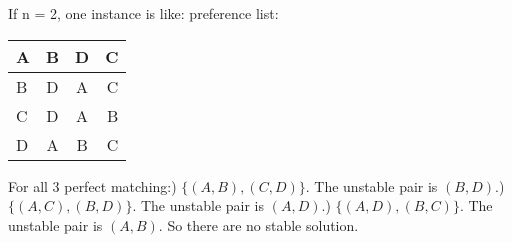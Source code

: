 \documentclass{article}       %
\begin{document}
\begin{enumerate}
\begin{enumerate}
                If n = 2, one instance is like: \newline
                preference list:
                \begin{tabular}{ | l | c | c | r | }
                	\hline
                	A & B & D & C\\ \hline
                	B & D & A & C \\ \hline
                	C & D & A & B \\ \hline
                	D & A & B & C \\ \hline
                \end{tabular} \newline
            For all 3 perfect matching:) $\{(A, B), (C, D)\}$. The unstable pair is $(B, D)$.) $\{(A, C), (B, D)\}$. The unstable pair is $(A, D)$.) $\{(A, D), (B, C)\}$. The unstable pair is $(A, B)$.\newline
            So there are no stable solution.\newline
                

\end{enumerate}
\end{enumerate}
\end{document}
